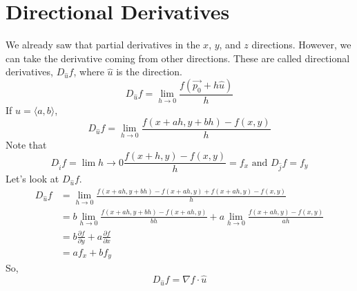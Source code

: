 \section{Directional Derivatives}
\noindent
We already saw that partial derivatives in the $x$, $y$, and $z$ directions. However, we can take the derivative coming from other directions. These are called directional derivatives, $D_{\hat{u}}{f}$, where $\hat{u}$ is the direction.
\begin{equation*}
	D_{\hat{u}}{f} = \lim_{h \to 0}{\frac{f(\vec{p_0} + h\hat{u})}{h}}
\end{equation*}
\noindent
If $\hat{u} = \langle a, b \rangle$, 
\begin{equation*}
	D_{\hat{u}}{f} = \lim_{h \to 0}{\frac{f(x+ah, y+bh) - f(x,y)}{h}}	
\end{equation*}
Note that
\begin{equation*}
	D_{\hat{i}}{f} = \lim{h \to 0}{\frac{f(x+h, y) - f(x, y)}{h}} = f_x \text{ and } D_{\hat{j}}{f} = f_y	
\end{equation*}
Let's look at $D_{\hat{u}}{f}$.
\begin{align*}
	D_{\hat{u}}{f} &= \lim_{h \to 0}{\frac{f(x+ah, y+bh) - f(x+ah, y) + f(x+ah, y) - f(x, y)}{h}} \\
	&= b\lim_{h \to 0}{\frac{f(x+ah, y+bh)-f(x+ah, y)}{bh}} + a\lim_{h \to 0}{\frac{f(x+ah, y) - f(x, y)}{ah}} \\
	&= b\frac{\partial f}{\partial y} + a\frac{\partial f}{\partial x} \\
	&= af_x + bf_y
\end{align*}
So, 
\begin{equation*}
	D_{\hat{u}}{f} =\nabla f \cdot \hat{u}
\end{equation*}

